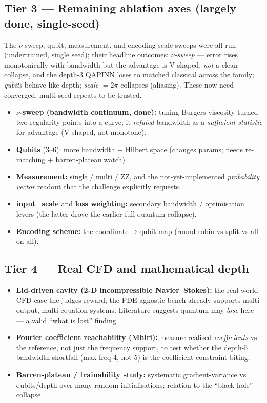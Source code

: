 \documentclass[11pt]{article}
\begin{document}
\subsection{Tier 3 --- Remaining ablation axes \textnormal{(largely done, single-seed)}}
The $\nu$-sweep, qubit, measurement, and encoding-scale sweeps were all run (undertrained,
single seed); their headline outcomes: \emph{$\nu$-sweep} --- error rises monotonically with
bandwidth but the advantage is V-shaped, \emph{not} a clean collapse, and the depth-3 QAPINN
loses to matched classical across the family; \emph{qubits} behave like depth; \emph{scale}
$=2\pi$ collapses (aliasing). These now need converged, multi-seed repeats to be trusted.
\begin{itemize}[nosep]
  \item \textbf{$\nu$-sweep (bandwidth continuum, done):} tuning Burgers viscosity
  turned two regularity points into a curve; it \emph{refuted} bandwidth as a
  \emph{sufficient statistic} for advantage (V-shaped, not monotone).
  \item \textbf{Qubits} (3--6): more bandwidth + Hilbert space (changes params;
  needs re-matching + barren-plateau watch).
  \item \textbf{Measurement:} single / multi / ZZ, and the not-yet-implemented
  \emph{probability vector} readout that the challenge explicitly requests.
  \item \textbf{input\_scale} and \textbf{loss weighting:} secondary bandwidth /
  optimisation levers (the latter drove the earlier full-quantum collapse).
  \item \textbf{Encoding scheme:} the coordinate$\to$qubit map (round-robin vs
  split vs all-on-all).
\end{itemize}

\subsection{Tier 4 --- Real CFD and mathematical depth}
\begin{itemize}[nosep]
  \item \textbf{Lid-driven cavity (2-D incompressible Navier--Stokes):} the
  real-world CFD case the judges reward; the PDE-agnostic bench already supports
  multi-output, multi-equation systems. Literature suggests quantum may
  \emph{lose} here --- a valid ``what is lost'' finding.
  \item \textbf{Fourier coefficient reachability (Mhiri):} measure realised
  \emph{coefficients} vs the reference, not just the frequency support, to test
  whether the depth-5 bandwidth shortfall (max freq 4, not 5) is the coefficient
  constraint biting.
  \item \textbf{Barren-plateau / trainability study:} systematic gradient-variance
  vs qubits/depth over many random initialisations; relation to the
  ``black-hole'' collapse.
\end{itemize}
\end{document}
